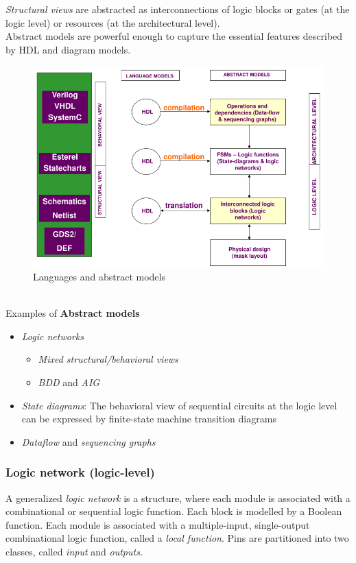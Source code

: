 \textit{Structural views} are abstracted as interconnections of logic blocks or gates (at the logic level) or resources (at the architectural level).\\
Abstract models are powerful enough to capture the essential features described by HDL and diagram models. 
\begin{figure}[H]
	\centering
	\includegraphics[height=100 mm]{./Cap2/Images/Image01.png}
	\caption[Optional caption]{Languages and abstract models}
	\label{fig:absMod}
\end{figure}
$ $\\[\spaceBreackLine]
Examples of \textbf{Abstract models}
\begin{itemize}
\item \textit{Logic networks}
\begin{itemize}
\item \textit{Mixed structural/behavioral views}
\item \textit{BDD} and \textit{AIG}
\end{itemize}
\item \textit{State diagrams}: The behavioral view of sequential circuits at the logic level can be expressed by finite-state machine transition diagrams
\item \textit{Dataflow} and \textit{sequencing graphs}
\end{itemize}

\subsubsection{Logic network (logic-level)}
A generalized \textit{logic network} is a structure, where each module is associated with a combinational or sequential logic function. Each block is modelled by a Boolean function. Each module is associated with a multiple-input, single-output combinational logic function, called a\textit{ local function}. Pins are partitioned into two classes, called \textit{input} and \textit{outputs}.
